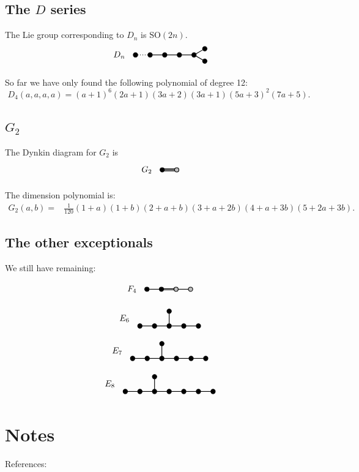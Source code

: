 \documentclass[11pt,oneside]{article}
\newcommand{\SO}{\mathrm{SO}}
\begin{document}
\subsection{The $D$ series}

The Lie group corresponding to $D_n$ is $\SO(2n).$
$$
\DynkinDn
$$

So far we have only found the following polynomial of degree 12:
$$
D_4(a, a, a, a) = (a+1)^6(2a+1)(3a+2)(3a+1)(5a+3)^2(7a+5).
$$

\subsection{$G_2$}

The Dynkin diagram for $G_2$ is
$$
\DynkinGtwo
$$

The dimension polynomial is:
\begin{align*}
G_2(a, b) =& \frac{1}{120} (1+a)(1+b)(2+a+b)(3+a+2b)(4+a+3b)(5+2a+3b).
\end{align*}

\subsection{The other exceptionals}

We still have remaining: %

$$
\DynkinFfour
$$

$$
\DynkinEsix
$$

$$
\DynkinEseven
$$

$$
\DynkinEeight
$$


\section{Notes}

References: 
\cite{Fulton2013}
\cite{Goodman2009}
\cite{Kraft2000}
\cite{Mukai2003}
\cite{Procesi2007}
\cite{Bump2004}
\cite{Miller2004}


{}

\end{document}
